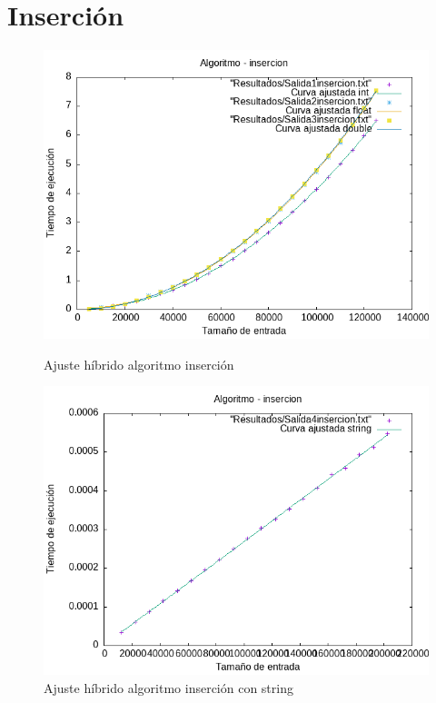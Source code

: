 \documentclass[11pt,openany]{book}
\begin{document}
\section*{Inserción}
\begin{figure}[H]
    \begin{minipage}{0.5\textwidth}
        \centering
        \includegraphics[width=\linewidth]{assets/AjusteHibrido_latex/Hibridoinsercion/insercion_hib.png}
        \caption{Ajuste híbrido algoritmo inserción}
        \label{fig:insercion}
    \end{minipage}%
    \begin{minipage}{0.5\textwidth}
        \centering
        \includegraphics[width=\linewidth]{assets/AjusteHibrido_latex/Hibridoinsercion/insercionstring_hib.png}
        \caption{Ajuste híbrido algoritmo inserción con string}
        \label{fig:insercion}
    \end{minipage}
\end{figure}
\end{document}
